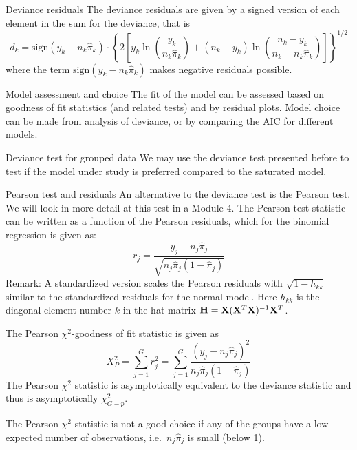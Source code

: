 \documentclass[
  ignorenonframetext,
]{beamer}
\begin{document}
\begin{frame}
\begin{block}{Deviance residuals}
\label{deviance-residuals}
The deviance residuals are given by a signed version of each element in
the sum for the deviance, that is
\[d_k=\text{sign}(y_k-n_k\hat{\pi}_k)\cdot \left\{ 
2[y_k\ln(\frac{y_k}{n_k\hat{\pi}_k})+(n_k-y_k)\ln(\frac{n_k-y_k}{n_k-n_k\hat{\pi}_k})]\right\}^{1/2}\]
where the term \(\text{sign}(y_k-n_k\hat{\pi}_k)\) makes negative
residuals possible.
\end{block}
\end{frame}

\begin{frame}{Model assessment and choice}
\label{model-assessment-and-choice}
The fit of the model can be assessed based on goodness of fit statistics
(and related tests) and by residual plots. Model choice can be made from
analysis of deviance, or by comparing the AIC for different models.

\begin{block}{Deviance test for grouped data}
\label{deviance-test-for-grouped-data}
We may use the deviance test presented before to test if the model under
study is preferred compared to the saturated model.
\end{block}
\end{frame}

\begin{frame}
\begin{block}{Pearson test and residuals}
\label{pearson-test-and-residuals}
An alternative to the deviance test is the Pearson test. We will look in
more detail at this test in a Module 4. The Pearson test statistic can
be written as a function of the Pearson residuals, which for the
binomial regression is given as:
\[ r_{j}=\frac{y_j-n_j\hat{\pi}_j}{\sqrt{n_j \hat{\pi}_j(1-\hat{\pi}_j)}}\]
Remark: A standardized version scales the Pearson residuals with
\(\sqrt{1-h_{kk}}\) similar to the standardized residuals for the normal
model. Here \(h_{kk}\) is the diagonal element number \(k\) in the hat
matrix \({\bf H}={\bf X}({\bf X}^T{\bf X})^{-1}{\bf X}^T\).
\end{block}
\end{frame}

\begin{frame}
The Pearson \(\chi^2\)-goodness of fit statistic is given as
\[ X_P^2=\sum_{j=1}^G r_j^2=\sum_{j=1}^G  \frac{(y_j-n_j\hat{\pi}_j)^2}{n_j \hat{\pi}_j(1-\hat{\pi}_j)}\]
The Pearson \(\chi^2\) statistic is asymptotically equivalent to the
deviance statistic and thus is asymptotically \(\chi^2_{G-p}\).

The Pearson \(\chi^2\) statistic is not a good choice if any of the
groups have a low expected number of observations,
i.e.~\(n_j \hat{\pi}_j\) is small (below 1).
\end{frame}
\end{document}

